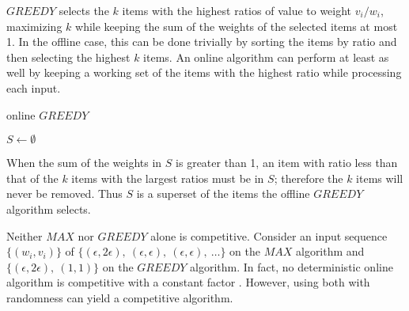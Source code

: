 $GREEDY$ selects the $k$ items with the highest ratios of value to weight $v_i/w_i$, maximizing $k$ while keeping the sum of the weights of the selected items at most 1. In the offline case, this can be done trivially by sorting the items by ratio and then selecting the highest $k$ items. An online algorithm can perform at least as well by keeping a working set of the items with the highest ratio while processing each input.

\begin{algorithm}
	\caption{online $GREEDY$}
	$S \leftarrow \emptyset$\;
\end{algorithm}

When the sum of the weights in $S$ is greater than 1, an item with ratio less than that of the $k$ items with the largest ratios must be in $S$; therefore the $k$ items will never be removed. Thus $S$ is a superset of the items the offline $GREEDY$ algorithm selects.

Neither $MAX$ nor $GREEDY$ alone is competitive. Consider an input sequence $\{(w_i,v_i)\}$ of $\{(\epsilon,2\epsilon),\ (\epsilon,\epsilon),\ (\epsilon,\epsilon),\ \ldots\}$ on the $MAX$ algorithm and $\{(\epsilon, 2\epsilon),\ (1,1)\}$ on the $GREEDY$ algorithm. In fact, no deterministic online algorithm is competitive with a constant factor \cite{iwama}. However, using both with randomness can yield a competitive algorithm.

